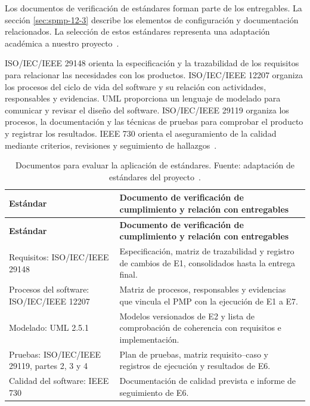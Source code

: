 Los documentos de verificación de estándares forman parte de los entregables. La sección \ref{sec:spmp-12-3} describe los elementos de configuración y documentación relacionados. La selección de estos estándares representa una adaptación académica a nuestro proyecto~\cite{std29148,std12207,std29119p2,std29119p3,std29119p4,uml,ieee730}.

ISO/IEC/IEEE 29148 orienta la especificación y la trazabilidad de los requisitos para relacionar las necesidades con los productos. ISO/IEC/IEEE 12207 organiza los procesos del ciclo de vida del software y su relación con actividades, responsables y evidencias. UML proporciona un lenguaje de modelado para comunicar y revisar el diseño del software. ISO/IEC/IEEE 29119 organiza los procesos, la documentación y las técnicas de pruebas para comprobar el producto y registrar los resultados. IEEE 730 orienta el aseguramiento de la calidad mediante criterios, revisiones y seguimiento de hallazgos~\cite{std29148,std12207,uml,std29119p2,std29119p3,std29119p4,ieee730}.

\begin{longtable}{|p{0.3\dimexpr\linewidth-4\tabcolsep-3\arrayrulewidth\relax}|p{0.7\dimexpr\linewidth-4\tabcolsep-3\arrayrulewidth\relax}|}
\caption{Documentos para evaluar la aplicación de estándares. Fuente: adaptación de estándares del proyecto~\cite{adaptacion2026}.}\\\hline
\textbf{Estándar} & \textbf{Documento de verificación de cumplimiento y relación con entregables}\\\hline
\endfirsthead\hline
\textbf{Estándar} & \textbf{Documento de verificación de cumplimiento y relación con entregables}\\\hline
\endhead
Requisitos: ISO/IEC/IEEE 29148 & Especificación, matriz de trazabilidad y registro de cambios de E1, consolidados hasta la entrega final.\\\hline
Procesos del software: ISO/IEC/IEEE 12207 & Matriz de procesos, responsables y evidencias que vincula el PMP con la ejecución de E1 a E7.\\\hline
Modelado: UML 2.5.1 & Modelos versionados de E2 y lista de comprobación de coherencia con requisitos e implementación.\\\hline
Pruebas: ISO/IEC/IEEE 29119, partes 2, 3 y 4 & Plan de pruebas, matriz requisito--caso y registros de ejecución y resultados de E6.\\\hline
Calidad del software: IEEE 730 & Documentación de calidad prevista e informe de seguimiento de E6.\\\hline
\end{longtable}
